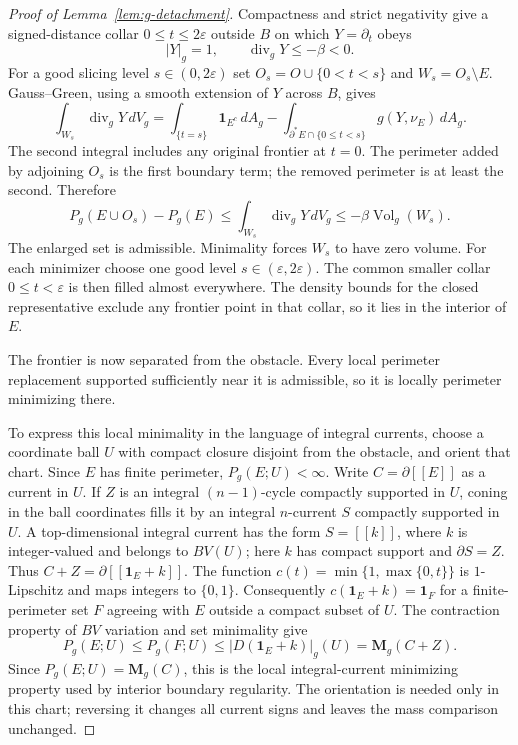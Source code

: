 \begin{proof}[Proof of Lemma~\ref{lem:g-detachment}]
Compactness and strict negativity give a signed-distance collar
$0\le t\le2\varepsilon$ outside $B$ on which $Y=\partial_t$ obeys
\[
 |Y|_g=1,\qquad \operatorname{div}_gY\le-\beta<0.
\]
For a good slicing level $s\in(0,2\varepsilon)$ set
$O_s=O\cup\{0<t<s\}$ and $W_s=O_s\setminus E$.
Gauss--Green, using a smooth extension of $Y$ across $B$, gives
\[
 \int_{W_s}\operatorname{div}_gY\,dV_g
 =\int_{\{t=s\}}\mathbf1_{E^c}\,dA_g
  -\int_{\partial^*E\cap\{0\le t<s\}}g(Y,\nu_E)\,dA_g.
\]
The second integral includes any original frontier at $t=0$.
The perimeter added by adjoining $O_s$ is the first boundary term;
the removed perimeter is at least the second.  Therefore
\begin{equation}
 P_g(E\cup O_s)-P_g(E)
 \le\int_{W_s}\operatorname{div}_gY\,dV_g
 \le-\beta\operatorname{Vol}_g(W_s).
 \label{eq:g-inner-collar}
\end{equation}
The enlarged set is admissible.  Minimality forces $W_s$ to have
zero volume.  For each minimizer choose one good level
$s\in(\varepsilon,2\varepsilon)$.  The common smaller collar
$0\le t<\varepsilon$ is then filled almost everywhere.  The density
bounds for the closed representative exclude any frontier point in
that collar, so it lies in the interior of $E$.

The frontier is now separated from the obstacle.  Every local
perimeter replacement supported sufficiently near it is admissible,
so it is locally perimeter minimizing there.

To express this local minimality in the language of integral currents,
choose a coordinate ball $U$ with compact closure disjoint from the
obstacle, and orient that chart.  Since $E$ has finite perimeter,
$P_g(E;U)<\infty$.  Write $C=\partial[\![E]\!]$ as a current in
$U$.  If $Z$ is an integral $(n-1)$-cycle compactly
supported in $U$, coning in the ball coordinates fills it by an
integral $n$-current $S$ compactly supported in $U$.  A
top-dimensional integral current has the form $S=[\![k]\!]$, where
$k$ is integer-valued and belongs to $BV(U)$; here $k$ has compact
support and $\partial S=Z$.  Thus
$C+Z=\partial[\![\mathbf 1_E+k]\!]$.  The function
$c(t)=\min\{1,\max\{0,t\}\}$ is $1$-Lipschitz and maps integers
to $\{0,1\}$.  Consequently $c(\mathbf 1_E+k)=\mathbf 1_F$ for a
finite-perimeter set $F$ agreeing with $E$ outside a compact subset
of $U$.  The contraction property of $BV$ variation and set
minimality give
\[
 P_g(E;U)\le P_g(F;U)
 \le |D(\mathbf 1_E+k)|_g(U)
 =\mathbf M_g(C+Z).
\]
Since $P_g(E;U)=\mathbf M_g(C)$, this is the local integral-current
minimizing property used by interior boundary regularity.  The
orientation is needed only in this chart; reversing it changes all
current signs and leaves the mass comparison unchanged.


\end{proof}
